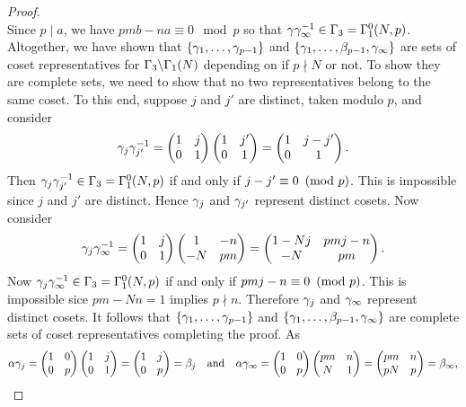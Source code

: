 \begin{proof}
\[        \]
        Since $p \mid a$, we have $pmb-na \equiv 0 \mod{p}$ so that $\gamma\gamma_{\infty}^{-1} \in \Gamma_{3} = \Gamma_{1}^{0}(N,p)$. Altogether, we have shown that $\{\gamma_{1},\ldots,\gamma_{p-1}\}$ and $\{\gamma_{1},\ldots,\beta_{p-1},\gamma_{\infty}\}$ are sets of coset representatives for $\Gamma_{3}\backslash\Gamma_{1}(N)$ depending on if $p \nmid N$ or not. To show they are complete sets, we need to show that no two representatives belong to the same coset. To this end, suppose $j$ and $j'$ are distinct, taken modulo $p$, and consider
        \[
          \gamma_{j}\gamma_{j'}^{-1} = \begin{pmatrix} 1 & j \\ 0 & 1 \end{pmatrix}\begin{pmatrix} 1 & j' \\ 0 & 1 \end{pmatrix} = \begin{pmatrix} 1 & j-j' \\ 0 & 1 \end{pmatrix}.
        \]
        Then $\gamma_{j}\gamma_{j'}^{-1} \in \Gamma_{3} = \Gamma_{1}^{0}(N,p)$ if and only if $j-j' \equiv 0 \ \left(\text{mod }p\right)$. This is impossible since $j$ and $j'$ are distinct. Hence $\gamma_{j}$ and $\gamma_{j'}$ represent distinct cosets. Now consider
        \[
          \gamma_{j}\gamma_{\infty}^{-1} = \begin{pmatrix} 1 & j \\ 0 & 1 \end{pmatrix}\begin{pmatrix} 1 & -n \\ -N & pm \end{pmatrix} = \begin{pmatrix} 1-Nj & pmj-n \\ -N & pm \end{pmatrix}.
        \]
        Now $\gamma_{j}\gamma_{\infty}^{-1} \in  \Gamma_{3} = \Gamma_{1}^{0}(N,p)$ if and only if $pmj-n \equiv 0 \ \left(\text{mod }p\right)$. This is impossible sice $pm-Nn = 1$ implies $p \nmid n$. Therefore $\gamma_{j}$ and $\gamma_{\infty}$ represent distinct cosets. It follows that $\{\gamma_{1},\ldots,\gamma_{p-1}\}$ and $\{\gamma_{1},\ldots,\beta_{p-1},\gamma_{\infty}\}$ are complete sets of coset representatives completing the proof. As
        \[
          \alpha\gamma_{j} = \begin{pmatrix} 1 & 0 \\ 0 & p \end{pmatrix}\begin{pmatrix} 1 & j \\ 0 & 1 \end{pmatrix} = \begin{pmatrix} 1 & j \\ 0 & p \end{pmatrix} = \beta_{j} \quad \text{and} \quad \alpha\gamma_{\infty} = \begin{pmatrix} 1 & 0 \\ 0 & p \end{pmatrix}\begin{pmatrix} pm & n \\ N & 1 \end{pmatrix} = \begin{pmatrix} pm & n \\ pN & p \end{pmatrix} = \beta_{\infty},
\]
\end{proof}
